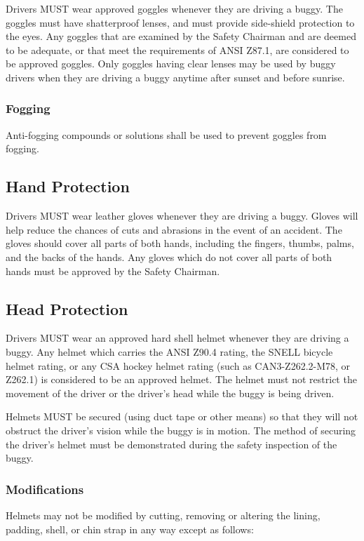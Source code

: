 \documentclass[openany]{book}
\begin{document}
Drivers MUST wear approved goggles whenever they are driving a buggy. The goggles must have shatterproof lenses, and must provide side-shield protection to the eyes. Any goggles that are examined by the Safety Chairman and are deemed to be adequate, or that meet the requirements of ANSI Z87.1, are considered to be approved goggles. Only goggles having clear lenses may be used by buggy drivers when they are driving a buggy anytime after sunset and before sunrise.

\subsubsection{Fogging}
Anti-fogging compounds or solutions shall be used to prevent goggles from fogging.

\subsection{Hand Protection}

Drivers MUST wear leather gloves whenever they are driving a buggy. Gloves will help reduce the chances of cuts and abrasions in the event of an accident. The gloves should cover all parts of both hands, including the fingers, thumbs, palms, and the backs of the hands. Any gloves which do not cover all parts of both hands must be approved by the Safety Chairman.

\subsection{Head Protection}

Drivers MUST wear an approved hard shell helmet whenever they are driving a buggy. Any helmet which carries the ANSI Z90.4 rating, the SNELL bicycle helmet rating, or any CSA hockey helmet rating (such as CAN3-Z262.2-M78, or Z262.1) is considered to be an approved helmet. The helmet must not restrict the movement of the driver or the driver's head while the buggy is being driven.

Helmets MUST be secured (using duct tape or other means) so that they will not obstruct the driver's vision while the buggy is in motion. The method of securing the driver's helmet must be demonstrated during the safety inspection of the buggy.

\subsubsection{Modifications}
Helmets may not be modified by cutting, removing or altering the lining, padding, shell, or chin strap in any way except as follows:
\end{document}
